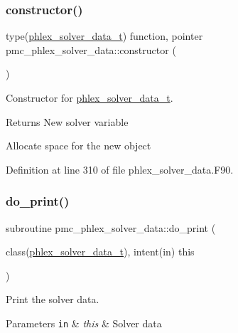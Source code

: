 \subsubsection{\texorpdfstring{constructor()}{constructor()}}
{\footnotesize\ttfamily type(\mbox{\hyperlink{structpmc__phlex__solver__data_1_1phlex__solver__data__t}{phlex\+\_\+solver\+\_\+data\+\_\+t}}) function, pointer pmc\+\_\+phlex\+\_\+solver\+\_\+data\+::constructor (\begin{DoxyParamCaption}{ }\end{DoxyParamCaption})\hspace{0.3cm}{\ttfamily [private]}}



Constructor for \mbox{\hyperlink{structpmc__phlex__solver__data_1_1phlex__solver__data__t}{phlex\+\_\+solver\+\_\+data\+\_\+t}}. 

\begin{DoxyReturn}{Returns}
New solver variable 
\end{DoxyReturn}
Allocate space for the new object 

Definition at line 310 of file phlex\+\_\+solver\+\_\+data.\+F90.

\mbox{\label{namespacepmc__phlex__solver__data_a471de3023e1bb6f999905cc0870d37f5}} 
\subsubsection{\texorpdfstring{do\+\_\+print()}{do\_print()}}
{\footnotesize\ttfamily subroutine pmc\+\_\+phlex\+\_\+solver\+\_\+data\+::do\+\_\+print (\begin{DoxyParamCaption}\item[{class(\mbox{\hyperlink{structpmc__phlex__solver__data_1_1phlex__solver__data__t}{phlex\+\_\+solver\+\_\+data\+\_\+t}}), intent(in)}]{this }\end{DoxyParamCaption})\hspace{0.3cm}{\ttfamily [private]}}



Print the solver data. 


\begin{DoxyParams}[1]{Parameters}
\mbox{\tt in}  & {\em this} & Solver data \\
\hline
\end{DoxyParams}


